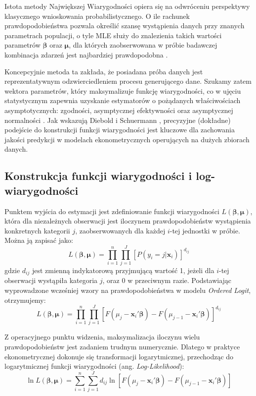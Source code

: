 Istota metody Największej Wiarygodności opiera się na odwróceniu perspektywy klasycznego wnioskowania probabilistycznego. O ile rachunek prawdopodobieństwa pozwala określić szansę wystąpienia danych przy znanych parametrach populacji, o tyle MLE służy do znalezienia takich wartości parametrów $\boldsymbol{\beta}$ oraz $\boldsymbol{\mu}$, dla których zaobserwowana w próbie badawczej kombinacja zdarzeń jest najbardziej prawdopodobna \cite{greene2003}. 

Koncepcyjnie metoda ta zakłada, że posiadana próba danych jest reprezentatywnym odzwierciedleniem procesu generującego dane. Szukamy zatem wektora parametrów, który maksymalizuje funkcję wiarygodności, co w ujęciu statystycznym zapewnia uzyskanie estymatorów o pożądanych właściwościach asymptotycznych: zgodności, asymptycznej efektywności oraz asymptycznej normalności \cite{diebold1996}. Jak wskazują Diebold i Schuermann \cite{diebold1996}, precyzyjne (dokładne) podejście do konstrukcji funkcji wiarygodności jest kluczowe dla zachowania jakości predykcji w modelach ekonometrycznych operujących na dużych zbiorach danych.

\subsection{Konstrukcja funkcji wiarygodności i log-wiarygodności}

Punktem wyjścia do estymacji jest zdefiniowanie funkcji wiarygodności $L(\boldsymbol{\beta}, \boldsymbol{\mu})$, która dla niezależnych obserwacji jest iloczynem prawdopodobieństw wystąpienia konkretnych kategorii $j$, zaobserwowanych dla każdej $i$-tej jednostki w próbie. Można ją zapisać jako:
\begin{equation}
    L(\boldsymbol{\beta}, \boldsymbol{\mu}) = \prod_{i=1}^{n} \prod_{j=1}^{J} [P(y_i = j | \mathbf{x}_i)]^{d_{ij}}
\end{equation}
gdzie $d_{ij}$ jest zmienną indykatorową przyjmującą wartość 1, jeżeli dla $i$-tej obserwacji wystąpiła kategoria $j$, oraz 0 w przeciwnym razie. Podstawiając wyprowadzone wcześniej wzory na prawdopodobieństwa w modelu \textit{Ordered Logit}, otrzymujemy:
\begin{equation}
    L(\boldsymbol{\beta}, \boldsymbol{\mu}) = \prod_{i=1}^{n} \prod_{j=1}^{J} [F(\mu_j - \mathbf{x}_i' \boldsymbol{\beta}) - F(\mu_{j-1} - \mathbf{x}_i' \boldsymbol{\beta})]^{d_{ij}}
\end{equation}

Z operacyjnego punktu widzenia, maksymalizacja iloczynu wielu prawdopodobieństw jest zadaniem trudnym numerycznie. Dlatego w praktyce ekonometrycznej dokonuje się transformacji logarytmicznej, przechodząc do logarytmicznej funkcji wiarygodności (ang. \textit{Log-Likelihood}):
\begin{equation}
    \ln L(\boldsymbol{\beta}, \boldsymbol{\mu}) = \sum_{i=1}^{n} \sum_{j=1}^{J} d_{ij} \ln [F(\mu_j - \mathbf{x}_i' \boldsymbol{\beta}) - F(\mu_{j-1} - \mathbf{x}_i' \boldsymbol{\beta})]
\end{equation}

